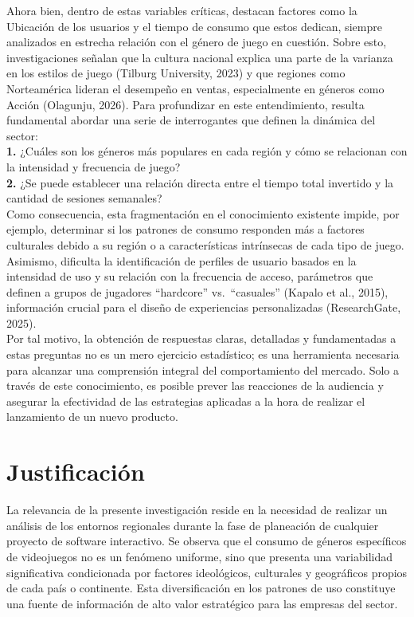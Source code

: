 \documentclass[oneside,11pt]{Latex/Classes/PhDthesisPSnPDF}
\begin{document}
Ahora bien, dentro de estas variables críticas, destacan factores como
la Ubicación de los usuarios y el tiempo de consumo que estos dedican,
siempre analizados en estrecha relación con el género de juego en
cuestión. Sobre esto, investigaciones señalan que la cultura nacional
explica una parte de la varianza en los estilos de juego (Tilburg
University, 2023) y que regiones como Norteamérica lideran el desempeño
en ventas, especialmente en géneros como Acción (Olagunju, 2026). Para
profundizar en este entendimiento, resulta fundamental abordar una serie
de interrogantes que definen la dinámica del sector:\\

\textbf{1.} ¿Cuáles son los géneros más populares en cada región y cómo
se relacionan con la intensidad y frecuencia de juego?\\

\textbf{2.} ¿Se puede establecer una relación directa entre el tiempo
total invertido y la cantidad de sesiones semanales?\\

Como consecuencia, esta fragmentación en el conocimiento existente
impide, por ejemplo, determinar si los patrones de consumo responden más
a factores culturales debido a su región o a características intrínsecas
de cada tipo de juego. Asimismo, dificulta la identificación de perfiles
de usuario basados en la intensidad de uso y su relación con la
frecuencia de acceso, parámetros que definen a grupos de jugadores
``hardcore'' vs.~``casuales'' (Kapalo et al., 2015), información crucial
para el diseño de experiencias personalizadas (ResearchGate, 2025).\\

Por tal motivo, la obtención de respuestas claras, detalladas y
fundamentadas a estas preguntas no es un mero ejercicio estadístico; es
una herramienta necesaria para alcanzar una comprensión integral del
comportamiento del mercado. Solo a través de este conocimiento, es
posible prever las reacciones de la audiencia y asegurar la efectividad
de las estrategias aplicadas a la hora de realizar el lanzamiento de un
nuevo producto.

\section{Justificación}

La relevancia de la presente investigación reside en la necesidad de
realizar un análisis de los entornos regionales durante la fase de
planeación de cualquier proyecto de software interactivo. Se observa que
el consumo de géneros específicos de videojuegos no es un fenómeno
uniforme, sino que presenta una variabilidad significativa condicionada
por factores ideológicos, culturales y geográficos propios de cada país
o continente. Esta diversificación en los patrones de uso constituye una
fuente de información de alto valor estratégico para las empresas del
sector.
\end{document}
